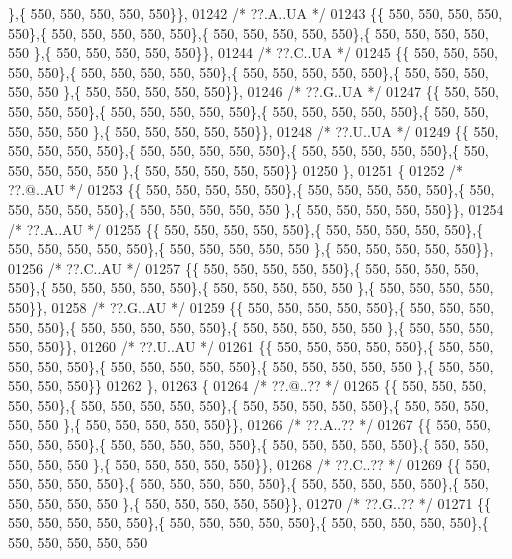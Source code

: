\begin{DoxyCode}
      \},\{ 550, 550, 550, 550, 550\}\},
01242 \textcolor{comment}{/* ??.A..UA */}
01243 \{\{ 550, 550, 550, 550, 550\},\{ 550, 550, 550, 550, 550\},\{ 550, 550, 550, 550, 550\},\{ 550, 550, 550, 550, 550
      \},\{ 550, 550, 550, 550, 550\}\},
01244 \textcolor{comment}{/* ??.C..UA */}
01245 \{\{ 550, 550, 550, 550, 550\},\{ 550, 550, 550, 550, 550\},\{ 550, 550, 550, 550, 550\},\{ 550, 550, 550, 550, 550
      \},\{ 550, 550, 550, 550, 550\}\},
01246 \textcolor{comment}{/* ??.G..UA */}
01247 \{\{ 550, 550, 550, 550, 550\},\{ 550, 550, 550, 550, 550\},\{ 550, 550, 550, 550, 550\},\{ 550, 550, 550, 550, 550
      \},\{ 550, 550, 550, 550, 550\}\},
01248 \textcolor{comment}{/* ??.U..UA */}
01249 \{\{ 550, 550, 550, 550, 550\},\{ 550, 550, 550, 550, 550\},\{ 550, 550, 550, 550, 550\},\{ 550, 550, 550, 550, 550
      \},\{ 550, 550, 550, 550, 550\}\}
01250 \},
01251 \{
01252 \textcolor{comment}{/* ??.@..AU */}
01253 \{\{ 550, 550, 550, 550, 550\},\{ 550, 550, 550, 550, 550\},\{ 550, 550, 550, 550, 550\},\{ 550, 550, 550, 550, 550
      \},\{ 550, 550, 550, 550, 550\}\},
01254 \textcolor{comment}{/* ??.A..AU */}
01255 \{\{ 550, 550, 550, 550, 550\},\{ 550, 550, 550, 550, 550\},\{ 550, 550, 550, 550, 550\},\{ 550, 550, 550, 550, 550
      \},\{ 550, 550, 550, 550, 550\}\},
01256 \textcolor{comment}{/* ??.C..AU */}
01257 \{\{ 550, 550, 550, 550, 550\},\{ 550, 550, 550, 550, 550\},\{ 550, 550, 550, 550, 550\},\{ 550, 550, 550, 550, 550
      \},\{ 550, 550, 550, 550, 550\}\},
01258 \textcolor{comment}{/* ??.G..AU */}
01259 \{\{ 550, 550, 550, 550, 550\},\{ 550, 550, 550, 550, 550\},\{ 550, 550, 550, 550, 550\},\{ 550, 550, 550, 550, 550
      \},\{ 550, 550, 550, 550, 550\}\},
01260 \textcolor{comment}{/* ??.U..AU */}
01261 \{\{ 550, 550, 550, 550, 550\},\{ 550, 550, 550, 550, 550\},\{ 550, 550, 550, 550, 550\},\{ 550, 550, 550, 550, 550
      \},\{ 550, 550, 550, 550, 550\}\}
01262 \},
01263 \{
01264 \textcolor{comment}{/* ??.@..?? */}
01265 \{\{ 550, 550, 550, 550, 550\},\{ 550, 550, 550, 550, 550\},\{ 550, 550, 550, 550, 550\},\{ 550, 550, 550, 550, 550
      \},\{ 550, 550, 550, 550, 550\}\},
01266 \textcolor{comment}{/* ??.A..?? */}
01267 \{\{ 550, 550, 550, 550, 550\},\{ 550, 550, 550, 550, 550\},\{ 550, 550, 550, 550, 550\},\{ 550, 550, 550, 550, 550
      \},\{ 550, 550, 550, 550, 550\}\},
01268 \textcolor{comment}{/* ??.C..?? */}
01269 \{\{ 550, 550, 550, 550, 550\},\{ 550, 550, 550, 550, 550\},\{ 550, 550, 550, 550, 550\},\{ 550, 550, 550, 550, 550
      \},\{ 550, 550, 550, 550, 550\}\},
01270 \textcolor{comment}{/* ??.G..?? */}
01271 \{\{ 550, 550, 550, 550, 550\},\{ 550, 550, 550, 550, 550\},\{ 550, 550, 550, 550, 550\},\{ 550, 550, 550, 550, 550

\end{DoxyCode}
